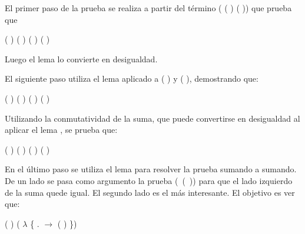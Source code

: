 \begin{AgdaAlign}
El primer paso de la prueba se realiza a partir del término ( ( )   ( )) que prueba que 
\begin{center}
\AgdaFunction{[}  \AgdaFunction{]}  ( ) (  \AgdaFunction{+} ) \AgdaFunction{$\sim$}  ( ) ( ) 
\end{center}
Luego el lema \AgdaFunction{$\sim\rightarrow\leq$} lo convierte en desigualdad. 

El siguiente paso utiliza el lema  aplicado a ( ) y ( ), demostrando que:
\begin{center}
\AgdaFunction{[}  \AgdaFunction{]}  ( ) ( ) \AgdaFunction{$\leq$}  ( ) \AgdaFunction{+} ( )
\end{center}

Utilizando la conmutatividad de la suma, que puede convertirse en desigualdad al aplicar el lema \AgdaFunction{$\sim\rightarrow\leq$}, se prueba que:
\begin{center}
\AgdaFunction{[}  \AgdaFunction{]}  ( ) \AgdaFunction{+} ( ) \AgdaFunction{$\leq$}  ( ) \AgdaFunction{+} ( )
\end{center}

En el último paso se utiliza el lema  para resolver la prueba sumando a sumando. De un lado se pasa como argumento la prueba \hbox{( ( ))} para que el lado izquierdo de la suma quede igual. El segundo lado es el más interesante. El objetivo es ver que: 
\begin{center}
\AgdaFunction{[}  \AgdaFunction{]}  ( ) \AgdaFunction{$\leq$} ( $\lambda$ \{ . $\rightarrow$  ( )  \})
\end{center}


\end{AgdaAlign}
